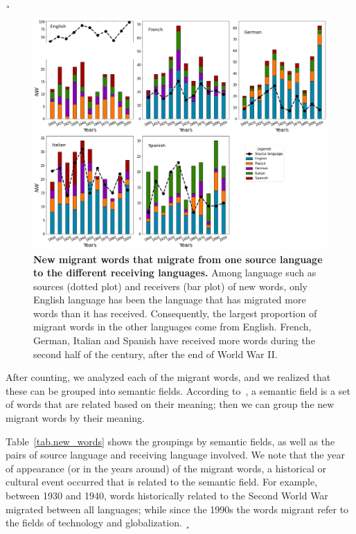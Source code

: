 \documentclass[10pt,letterpaper]{article} %
\begin{document}
	¸
		\begin{figure}[!h] %
		\begin{adjustwidth}{-1.2in}{0in}
			\includegraphics[scale=.35]{NW_A.png}
			\caption{{\bf New migrant words that migrate from one source language to the different receiving languages.} Among language such as sources (dotted plot) and receivers (bar plot) of new words, only English language has been the language that has migrated more words than it has received. Consequently, the largest proportion of migrant words in the other languages ​​come from English. French, German, Italian and Spanish have received more words during the second half of the century, after the end of World War II.	
			}
			\label{fig.NMW_A}
		\end{adjustwidth}
	\end{figure} %
	
	
	After counting, we analyzed each of the migrant words, and we realized that these can be grouped into semantic fields. According to~\cite{semantic_oxford}, a semantic field is a set of words that are related based on their meaning; then we can group the new migrant words by their meaning.
	
	Table~\ref{tab.new_words} shows the groupings by semantic fields, as well as the pairs of source language and receiving language involved. We note that the year of appearance (or in the years around) of the migrant words, a historical or cultural event occurred that is related to the semantic field. For example, between 1930 and 1940, words historically related to the Second World War migrated between all languages; while since the 1990s the words migrant refer to the fields of technology and globalization.
	¸
	
\end{document}
